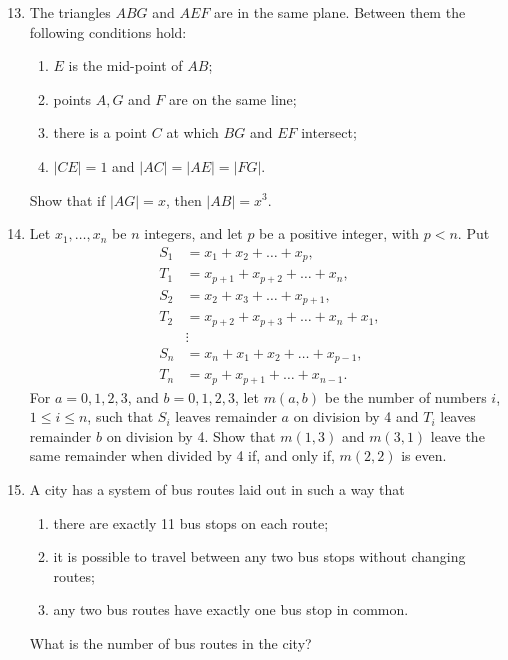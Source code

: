 \documentclass[12pt]{article}
\begin{document}
\begin{enumerate}
\setcounter{enumi}{12}
\item The triangles $ABG$ and $AEF$ are in the same plane. Between them the following conditions hold: \begin{enumerate} \item[(a)] $E$ is the mid-point of $AB$; \item[(b)] points $A, G$ and $F$ are on the same line; \item[(c)] there is a point $C$ at which $BG$ and $EF$ intersect; \item[(d)] $|CE| = 1$ and $|AC| = |AE| = |FG|$. \end{enumerate} Show that if $|AG| = x$, then $|AB| = x^3$.

\item Let $x_1, \ldots, x_n$ be $n$ integers, and let $p$ be a positive integer, with $p < n$. Put \begin{align*} S_1 &= x_1 + x_2 + \ldots + x_p, \\ T_1 &= x_{p+1} + x_{p+2} + \ldots + x_n, \\ S_2 &= x_2 + x_3 + \ldots + x_{p+1}, \\ T_2 &= x_{p+2} + x_{p+3} + \ldots + x_n + x_1, \\ &\vdots \\ S_n &= x_n + x_1 + x_2 + \ldots + x_{p-1}, \\ T_n &= x_p + x_{p+1} + \ldots + x_{n-1}. \end{align*} For $a = 0,1,2,3$, and $b = 0,1,2,3$, let $m(a,b)$ be the number of numbers $i$, $1 \le i \le n$, such that $S_i$ leaves remainder $a$ on division by 4 and $T_i$ leaves remainder $b$ on division by 4. Show that $m(1,3)$ and $m(3,1)$ leave the same remainder when divided by 4 if, and only if, $m(2,2)$ is even.

\item A city has a system of bus routes laid out in such a way that \begin{enumerate} \item[(a)] there are exactly 11 bus stops on each route; \item[(b)] it is possible to travel between any two bus stops without changing routes; \item[(c)] any two bus routes have exactly one bus stop in common. \end{enumerate} What is the number of bus routes in the city?

\end{enumerate}
\end{document}
